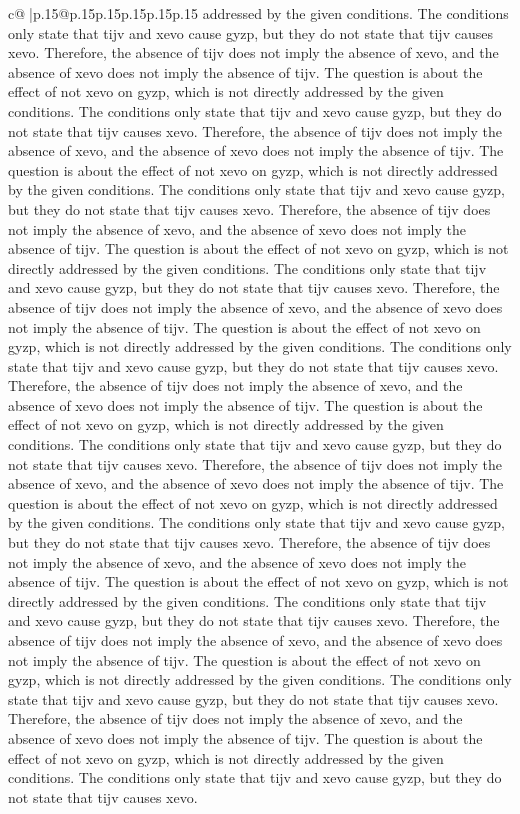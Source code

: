 \documentclass{article}
\begin{document}
{\begin{supertabular}{c@{$\;$}|p{.15\linewidth}@{}p{.15\linewidth}p{.15\linewidth}p{.15\linewidth}p{.15\linewidth}p{.15\linewidth}}
{{{addressed by the given conditions. The conditions only state that tijv and xevo cause gyzp, but they do not state that tijv causes xevo. Therefore, the absence of tijv does not imply the absence of xevo, and the absence of xevo does not imply the absence of tijv. The question is about the effect of not xevo on gyzp, which is not directly addressed by the given conditions. The conditions only state that tijv and xevo cause gyzp, but they do not state that tijv causes xevo. Therefore, the absence of tijv does not imply the absence of xevo, and the absence of xevo does not imply the absence of tijv. The question is about the effect of not xevo on gyzp, which is not directly addressed by the given conditions. The conditions only state that tijv and xevo cause gyzp, but they do not state that tijv causes xevo. Therefore, the absence of tijv does not imply the absence of xevo, and the absence of xevo does not imply the absence of tijv. The question is about the effect of not xevo on gyzp, which is not directly addressed by the given conditions. The conditions only state that tijv and xevo cause gyzp, but they do not state that tijv causes xevo. Therefore, the absence of tijv does not imply the absence of xevo, and the absence of xevo does not imply the absence of tijv. The question is about the effect of not xevo on gyzp, which is not directly addressed by the given conditions. The conditions only state that tijv and xevo cause gyzp, but they do not state that tijv causes xevo. Therefore, the absence of tijv does not imply the absence of xevo, and the absence of xevo does not imply the absence of tijv. The question is about the effect of not xevo on gyzp, which is not directly addressed by the given conditions. The conditions only state that tijv and xevo cause gyzp, but they do not state that tijv causes xevo. Therefore, the absence of tijv does not imply the absence of xevo, and the absence of xevo does not imply the absence of tijv. The question is about the effect of not xevo on gyzp, which is not directly addressed by the given conditions. The conditions only state that tijv and xevo cause gyzp, but they do not state that tijv causes xevo. Therefore, the absence of tijv does not imply the absence of xevo, and the absence of xevo does not imply the absence of tijv. The question is about the effect of not xevo on gyzp, which is not directly addressed by the given conditions. The conditions only state that tijv and xevo cause gyzp, but they do not state that tijv causes xevo. Therefore, the absence of tijv does not imply the absence of xevo, and the absence of xevo does not imply the absence of tijv. The question is about the effect of not xevo on gyzp, which is not directly addressed by the given conditions. The conditions only state that tijv and xevo cause gyzp, but they do not state that tijv causes xevo. Therefore, the absence of tijv does not imply the absence of xevo, and the absence of xevo does not imply the absence of tijv. The question is about the effect of not xevo on gyzp, which is not directly addressed by the given conditions. The conditions only state that tijv and xevo cause gyzp, but they do not state that tijv causes xevo. }}}
\end{supertabular}}
\end{document}
